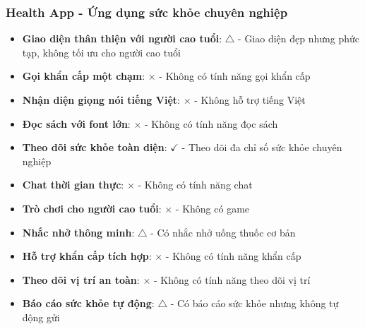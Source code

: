 \documentclass[12pt,a4paper]{article}
\begin{document}
\subsubsection{Health App - Ứng dụng sức khỏe chuyên nghiệp}
\begin{itemize}[leftmargin=2cm]
    \item \textbf{Giao diện thân thiện với người cao tuổi}: $\triangle$ - Giao diện đẹp nhưng phức tạp, không tối ưu cho người cao tuổi
    \item \textbf{Gọi khẩn cấp một chạm}: $\times$ - Không có tính năng gọi khẩn cấp
    \item \textbf{Nhận diện giọng nói tiếng Việt}: $\times$ - Không hỗ trợ tiếng Việt
    \item \textbf{Đọc sách với font lớn}: $\times$ - Không có tính năng đọc sách
    \item \textbf{Theo dõi sức khỏe toàn diện}: $\checkmark$ - Theo dõi đa chỉ số sức khỏe chuyên nghiệp
    \item \textbf{Chat thời gian thực}: $\times$ - Không có tính năng chat
    \item \textbf{Trò chơi cho người cao tuổi}: $\times$ - Không có game
    \item \textbf{Nhắc nhở thông minh}: $\triangle$ - Có nhắc nhở uống thuốc cơ bản

    \item \textbf{Hỗ trợ khẩn cấp tích hợp}: $\times$ - Không có tính năng khẩn cấp
    \item \textbf{Theo dõi vị trí an toàn}: $\times$ - Không có tính năng theo dõi vị trí
    \item \textbf{Báo cáo sức khỏe tự động}: $\triangle$ - Có báo cáo sức khỏe nhưng không tự động gửi
\end{itemize}
\end{document}
